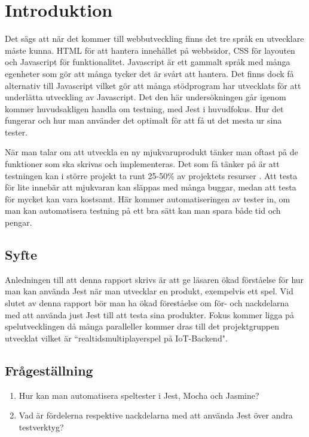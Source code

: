 \section{Introduktion}
\label{sec:david-introduction}

Det sägs att när det kommer till webbutveckling finns det tre språk en utvecklare måste kunna. HTML för att hantera innehållet på webbsidor, CSS för layouten och Javascript för funktionalitet. Javascript är ett gammalt språk med många egenheter som gör att många tycker det är svårt att hantera. Det finns dock få alternativ till Javascript vilket gör att många stödprogram har utvecklats för att underlätta utveckling av Javascript. Det den här undersökningen går igenom kommer huvudsakligen handla om testning, med Jest \cite{bib-jest} i huvudfokus. Hur det fungerar och hur man använder det optimalt för att få ut det mesta ur sina tester.

När man talar om att utveckla en ny mjukvaruprodukt tänker man oftast på de funktioner som ska skrivas och implementeras. Det som få tänker på är att testningen kan i större projekt ta runt 25-50\% av projektets resurser \cite{ADP}. Att testa för lite innebär att mjukvaran kan släppas med många buggar, medan att testa för mycket kan vara kostsamt. Här kommer automatiseringen av tester in, om man kan automatisera testning på ett bra sätt kan man spara både tid och pengar.

\subsection{Syfte}
Anledningen till att denna rapport skrivs är att ge läsaren ökad förståelse för hur man kan använda Jest när man utvecklar en produkt, exempelvis ett spel. Vid slutet av denna rapport bör man ha ökad föreståelse om för- och nackdelarna med att använda just Jest till att testa sina produkter. Fokus kommer ligga på spelutvecklingen då många paralleller kommer dras till det projektgruppen utvecklat vilket är ``realtidsmultiplayerspel på IoT-Backend".




\subsection{Frågeställning}
\label{subsec:david-research-questions}

\begin{enumerate}
\item Hur kan man automatisera speltester i Jest, Mocha och Jasmine?
\item Vad är fördelerna respektive nackdelarna med att använda Jest över andra testverktyg?

\end{enumerate}


